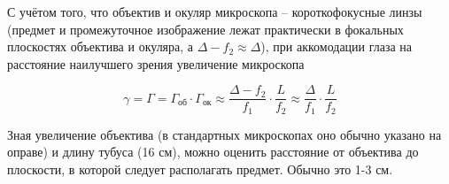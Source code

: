 С учётом того, что объектив и окуляр микроскопа -- короткофокусные линзы (предмет и промежуточное
изображение лежат практически в фокальных плоскостях объектива и окуляра, а 
$\Delta - f_2 \approx \Delta$), при аккомодации глаза на расстояние наилучшего зрения увеличение 
микроскопа

\begin{equation}
  \gamma = \Gamma = \Gamma_{\text{об}} \cdot \Gamma_{\text{ок}} \approx 
  \frac{\Delta - f_2}{f_1} \cdot \frac{L}{f_2} \approx \frac{\Delta}{f_1} \cdot \frac{L}{f_2}
\end{equation}

Зная увеличение объектива (в стандартных микроскопах оно обычно указано на оправе) и длину тубуса 
(16 см), можно оценить расстояние от объектива до плоскости, в которой следует располагать предмет. 
Обычно это 1-3 см.